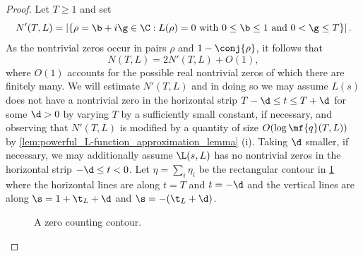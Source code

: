 \documentclass[12pt]{article}
\begin{document}
      \begin{proof}
        Let \(T \ge 1\) and set
        \[
          N'(T,L) = \left|\{\rho = \b+i\g \in \C:L(\rho) = 0 \text{ with } 0 \le \b \le 1 \text{ and } 0 < \g \le T\}\right|.
        \]
        As the nontrivial zeros occur in pairs \(\rho\) and \(1-\conj{\rho}\), it follows that
        \[
          N(T,L) = 2N'(T,L)+O(1),
        \]
        where \(O(1)\) accounts for the possible real nontrivial zeros of which there are finitely many. We will estimate \(N'(T,L)\) and in doing so we may assume \(L(s)\) does not have a nontrivial zero in the horizontal strip \(T-\d \le t \le T+\d\) for some \(\d > 0\) by varying \(T\) by a sufficiently small constant, if necessary, and observing that \(N'(T,L)\) is modified by a quantity of size \(O(\log{\mf{q}(T,L)})\) by \cref{lem:powerful_L-function_approximation_lemma} (i). Taking \(\d\) smaller, if necessary, we may additionally assume \(\L(s,L)\) has no nontrivial zeros in the horizontal strip \(-\d \le t < 0\). Let \(\eta = \sum_{i}\eta_{i}\) be the rectangular contour in \cref{fig:zero_counting_contour} where the horizontal lines are along \(t = T\) and \(t = -\d\) and the vertical lines are along \(\s = 1+\t_{L}+\d\) and \(\s = -(\t_{L}+\d)\).

        \begin{figure}[h]
          \centering
          \caption{A zero counting contour.}
          \label{fig:zero_counting_contour}
        \end{figure}
        

\end{proof}
\end{document}
